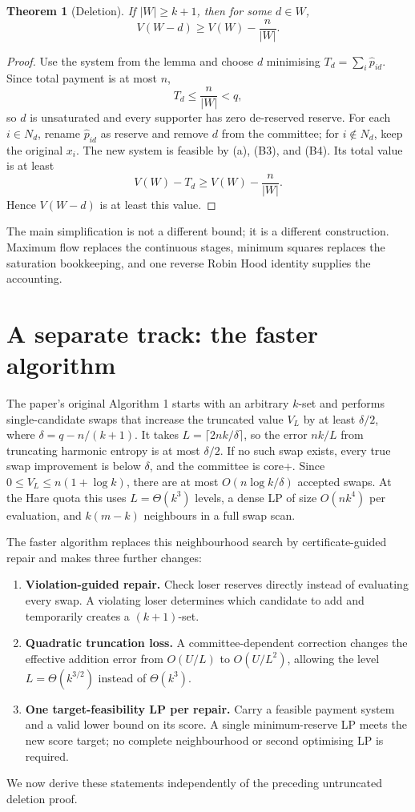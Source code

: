 \documentclass[11pt,a4paper]{article}
\newtheorem{theorem}{Theorem}[section]
\theoremstyle{definition}
\theoremstyle{remark}
\begin{document}
\begin{theorem}[Deletion]
If $|W|\ge k+1$, then for some $d\in W$,
\[
V(W-d)\ge V(W)-\frac n{|W|}.
\]
\end{theorem}
\begin{proof}
Use the system from the lemma and choose $d$ minimising $T_d=\sum_i\hat p_{id}$. Since total payment is at most $n$,
\[
T_d\le\frac n{|W|}<q,
\]
so $d$ is unsaturated and every supporter has zero de-reserved reserve. For each $i\in N_d$, rename $\hat p_{id}$ as reserve and remove $d$ from the committee; for $i\notin N_d$, keep the original $x_i$. The new system is feasible by (a), (B3), and (B4). Its total value is at least
\[
V(W)-T_d\ge V(W)-\frac n{|W|}.
\]
Hence $V(W-d)$ is at least this value.
\end{proof}

The main simplification is not a different bound; it is a different construction. Maximum flow replaces the continuous stages, minimum squares replaces the saturation bookkeeping, and one reverse Robin Hood identity supplies the accounting.

\section{A separate track: the faster algorithm}
The paper's original Algorithm 1 starts with an arbitrary $k$-set and performs single-candidate swaps that increase the truncated value $V_L$ by at least $\delta/2$, where $\delta=q-n/(k+1)$. It takes $L=\lceil2nk/\delta\rceil$, so the error $nk/L$ from truncating harmonic entropy is at most $\delta/2$. If no such swap exists, every true swap improvement is below $\delta$, and the committee is core+. Since $0\le V_L\le n(1+\log k)$, there are at most $O(n\log k/\delta)$ accepted swaps. At the Hare quota this uses $L=\Theta(k^3)$ levels, a dense LP of size $O(nk^4)$ per evaluation, and $k(m-k)$ neighbours in a full swap scan.

The faster algorithm replaces this neighbourhood search by certificate-guided repair and makes three further changes:
\begin{enumerate}
\item \textbf{Violation-guided repair.} Check loser reserves directly instead of evaluating every swap. A violating loser determines which candidate to add and temporarily creates a $(k+1)$-set.
\item \textbf{Quadratic truncation loss.} A committee-dependent correction changes the effective addition error from $O(U/L)$ to $O(U/L^2)$, allowing the level $L=\Theta(k^{3/2})$ instead of $\Theta(k^3)$.
\item \textbf{One target-feasibility LP per repair.} Carry a feasible payment system and a valid lower bound on its score. A single minimum-reserve LP meets the new score target; no complete neighbourhood or second optimising LP is required.
\end{enumerate}
We now derive these statements independently of the preceding untruncated deletion proof.
\end{document}
